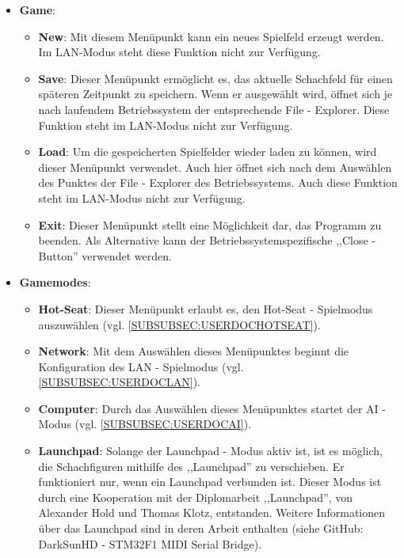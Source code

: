 \documentclass[12pt,a4paper]{article}
\begin{document}
\begin{itemize}
	\item{\textbf{Game}: \begin{itemize}
			\item{\textbf{New}: Mit diesem Menüpunkt kann ein neues Spielfeld erzeugt werden. Im LAN-Modus steht diese Funktion nicht zur Verfügung.  }
			
			\item{\textbf{Save}: Dieser Menüpunkt ermöglicht es, das aktuelle Schachfeld für einen späteren Zeitpunkt zu speichern. Wenn er ausgewählt wird, öffnet sich je nach laufendem Betriebssystem der entsprechende File - Explorer. Diese Funktion steht im LAN-Modus nicht zur Verfügung. }
			
			\item{\textbf{Load}: Um die gespeicherten Spielfelder wieder laden zu können, wird dieser Menüpunkt verwendet. Auch hier öffnet sich nach dem Auswählen des Punktes der File - Explorer des Betriebssystems. Auch diese Funktion steht im LAN-Modus nicht zur Verfügung.  }
			
			\item{\textbf{Exit}: Dieser Menüpunkt stellt eine  Möglichkeit dar, das Programm zu beenden. Als Alternative kann der Betriebssystemspezifische ,,Close - Button'' verwendet werden.}
		\end{itemize}}
		
	\item{\textbf{Gamemodes}: \begin{itemize}
			
		\item{\textbf{Hot-Seat}: Dieser Menüpunkt erlaubt es, den Hot-Seat - Spielmodus auszuwählen (vgl. \ref{SUBSUBSEC:USERDOCHOTSEAT}).}
	
		\item{\textbf{Network}: Mit dem Auswählen dieses Menüpunktes beginnt die Konfiguration des LAN - Spielmodus (vgl. \ref{SUBSUBSEC:USERDOCLAN}). }
		
		\item{\textbf{Computer}: Durch das Auswählen dieses Menüpunktes startet der AI - Modus (vgl. \ref{SUBSUBSEC:USERDOCAI}). }
		
		\item{\textbf{Launchpad}: Solange der Launchpad - Modus aktiv ist, ist es möglich, die Schachfiguren mithilfe des ,,Launchpad'' zu verschieben. Er funktioniert nur, wenn ein Launchpad verbunden ist. Dieser Modus ist durch eine Kooperation mit der Diplomarbeit ,,Launchpad'', von Alexander Hold und Thomas Klotz, entstanden. Weitere Informationen über das Launchpad sind in deren Arbeit enthalten (siehe GitHub: DarkSunHD - STM32F1 MIDI Serial Bridge).}	
	\end{itemize}}
	

\end{itemize}
\end{document}
